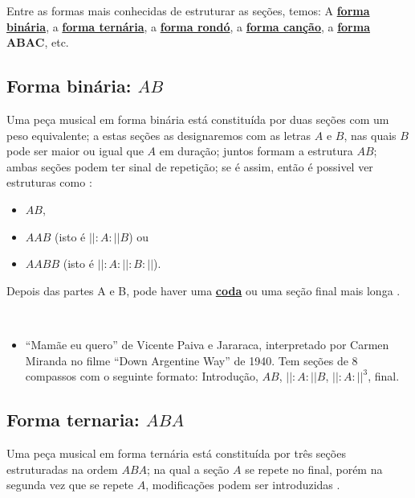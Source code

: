 Entre as formas mais conhecidas de estruturar as seções, temos:
A \hyperref[subsec:formabinaria]{\textbf{forma binária}}, 
a \hyperref[subsec:formaternaria]{\textbf{forma ternária}}, 
a \hyperref[subsec:formarondo]{\textbf{forma rondó}}, 
a \hyperref[subsec:formacancao]{\textbf{forma canção}}, 
a \hyperref[subsec:formaabac]{\textbf{forma $\mathbf{ABAC}$}}, 
etc.
 



\subsection{Forma binária: $AB$}
\label{subsec:formabinaria}
Uma peça musical em forma binária está constituída por duas seções 
com um peso equivalente; 
a estas seções as designaremos com as letras $A$ e $B$, 
nas quais $B$ pode ser maior ou igual que $A$ em duração; juntos
formam a estrutura $AB$;
ambas seções podem ter sinal de repetição; se é assim, então é possivel ver estruturas como 
\cite[pp. 71]{bennett1993elementos} \cite[pp. 93]{copland1974ouvir}:
\begin{itemize}
\item $AB$,
\item $AAB$ (isto é $||:A:||B$) ou 
\item $AABB$ (isto é $||:A:||:B:||$).
\end{itemize}
Depois das partes A e B, 
pode haver uma \hyperref[ref:Coda]{\textbf{coda}} 
ou uma seção final mais longa \cite[pp. 86-87]{holland2013music}.

\begin{example} ~
\begin{itemize}
\item ``Mamãe eu quero'' de Vicente Paiva e Jararaca,
interpretado por Carmen Miranda no filme ``Down Argentine Way'' de 1940. 
Tem seções de 8 compassos 
com o seguinte formato:
Introdução, $AB$, $||:A:||B$, $||:A:||^3$, final.
\end{itemize}
\end{example}




\subsection{Forma ternaria: $ABA$}
\label{subsec:formaternaria}
Uma peça musical em forma ternária está constituída por três seções 
estruturadas na ordem $ABA$; 
na qual a seção $A$ se repete no final,
porém na segunda vez que se repete $A$,
modificações podem ser introduzidas \cite[pp. 71]{bennett1993elementos} \cite[pp. 88]{holland2013music}.


